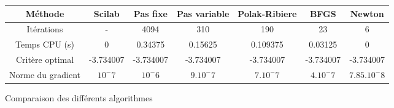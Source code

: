 \documentclass{article}
\begin{document}
    \begin{figure}
        \begin{tabular}{|c|cccccc|}
            \hline
            Méthode & Scilab & Pas fixe & Pas variable & Polak-Ribiere & BFGS & Newton \\
            \hline 
            Itérations & - & 4094 & 310 & 190 & 23 & 6\\
            Temps CPU (s) & 0 & 0.34375 & 0.15625 & 0.109375 & 0.03125 & 0\\
            Critère optimal & -3.734007 & -3.734007 & -3.734007 & -3.734007 & -3.734007 & -3.734007\\
            Norme du gradient & $10^-7$ & $10^-6$ & $9.10^-7$ & $7.10^-7$ & $4.10^-7$ & $7.85.10^-8$\\
            \hline
        \end{tabular}
        \caption{Comparaison des différents algorithmes}
        \label{comparAlgo}
    \end{figure}



\end{document}
